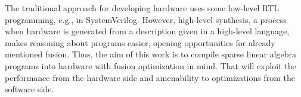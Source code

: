 The traditional approach for developing hardware uses some low-level RTL programming, e.g., in SystemVerilog. However, high-level synthesis, a process when hardware is generated from a description given in a high-level language, makes reasoning about programs easier, opening opportunities for already mentioned fusion. Thus, the aim of this work is to compile sparse linear algebra programs into hardware with fusion optimization in mind. That will exploit the performance from the hardware side and amenability to optimizations from the software side.


